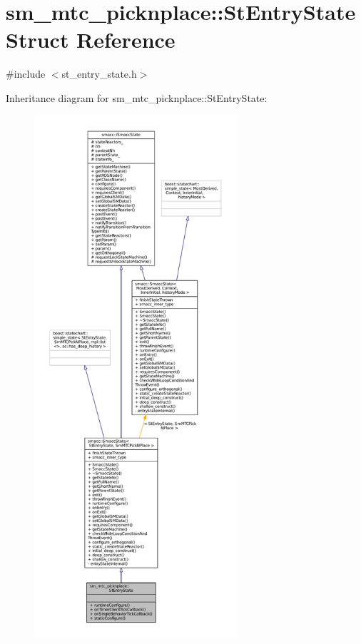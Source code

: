 \hypertarget{structsm__mtc__picknplace_1_1StEntryState}{}\section{sm\+\_\+mtc\+\_\+picknplace\+:\+:St\+Entry\+State Struct Reference}
\label{structsm__mtc__picknplace_1_1StEntryState}


{\ttfamily \#include $<$st\+\_\+entry\+\_\+state.\+h$>$}



Inheritance diagram for sm\+\_\+mtc\+\_\+picknplace\+:\+:St\+Entry\+State\+:
\nopagebreak
\begin{figure}[H]
\begin{center}
\leavevmode
\includegraphics[height=550pt]{structsm__mtc__picknplace_1_1StEntryState__inherit__graph}
\end{center}
\end{figure}


